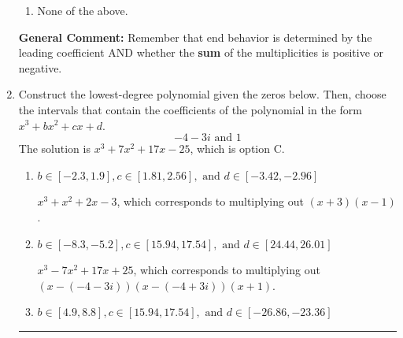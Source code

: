 \documentclass{extbook}[14pt]
\newcommand{\litem}[1]{\item #1

\rule{\textwidth}{0.4pt}}
\begin{document}
\begin{enumerate}
{\begin{enumerate}[label=\Alph*.]
\item None of the above.\end{enumerate}
\textbf{General Comment:} Remember that end behavior is determined by the leading coefficient AND whether the \textbf{sum} of the multiplicities is positive or negative.
}
\litem{
Construct the lowest-degree polynomial given the zeros below. Then, choose the intervals that contain the coefficients of the polynomial in the form $x^3+bx^2+cx+d$.
\[ -4 - 3 i \text{ and } 1 \]The solution is \( x^{3} +7 x^{2} +17 x -25 \), which is option C.\begin{enumerate}[label=\Alph*.]
\item \( b \in [-2.3, 1.9], c \in [1.81, 2.56], \text{ and } d \in [-3.42, -2.96] \)

$x^{3} + x^{2} +2 x -3$, which corresponds to multiplying out $(x + 3)(x -1)$.
\item \( b \in [-8.3, -5.2], c \in [15.94, 17.54], \text{ and } d \in [24.44, 26.01] \)

$x^{3} -7 x^{2} +17 x + 25$, which corresponds to multiplying out $(x-(-4 - 3 i))(x-(-4 + 3 i))(x + 1)$.
\item \( b \in [4.9, 8.8], c \in [15.94, 17.54], \text{ and } d \in [-26.86, -23.36] \)


\end{enumerate}}
\end{enumerate}
\end{document}
